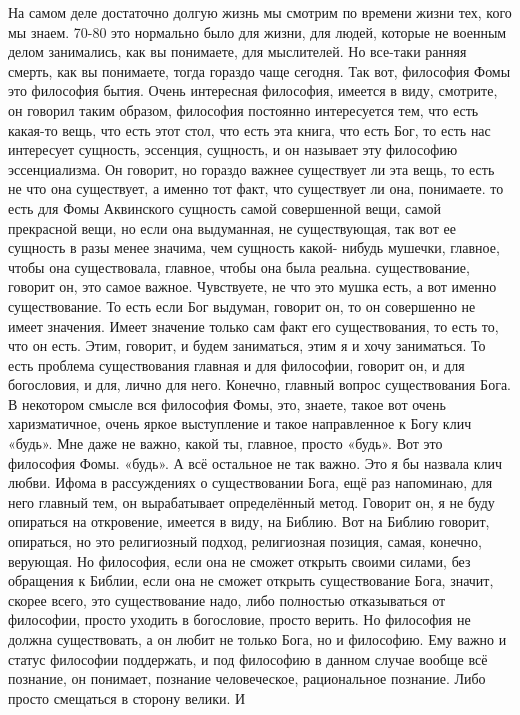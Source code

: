 На самом деле достаточно долгую жизнь мы смотрим по времени жизни тех, кого мы
знаем. 70-80 это нормально было для жизни, для людей, которые не военным делом
занимались, как вы понимаете, для мыслителей. Но все-таки ранняя смерть, как вы
понимаете, тогда гораздо чаще сегодня. Так вот, философия Фомы это философия
бытия. Очень интересная философия, имеется в виду, смотрите, он говорил таким
образом, философия постоянно интересуется тем, что есть какая-то вещь, что есть
этот стол, что есть эта книга, что есть Бог, то есть нас интересует сущность,
эссенция, сущность, и он называет эту философию эссенциализма. Он говорит, но
гораздо важнее существует ли эта вещь, то есть не что она существует, а именно
тот факт, что существует ли она, понимаете. то есть для Фомы Аквинского сущность
самой совершенной вещи, самой прекрасной вещи, но если она выдуманная, не
существующая, так вот ее сущность в разы менее значима, чем сущность какой-
нибудь мушечки, главное, чтобы она существовала, главное, чтобы она была
реальна. существование, говорит он, это самое важное. Чувствуете, не что это
мушка есть, а вот именно существование. То есть если Бог выдуман, говорит он, то
он совершенно не имеет значения. Имеет значение только сам факт его
существования, то есть то, что он есть. Этим, говорит, и будем заниматься, этим
я и хочу заниматься. То есть проблема существования главная и для философии,
говорит он, и для богословия, и для, лично для него. Конечно, главный вопрос
существования Бога. В некотором смысле вся философия Фомы, это, знаете, такое
вот очень харизматичное, очень яркое выступление и такое направленное к Богу
клич «будь». Мне даже не важно, какой ты, главное, просто «будь». Вот это
философия Фомы. «будь». А всё остальное не так важно. Это я бы назвала клич
любви. Ифома в рассуждениях о существовании Бога, ещё раз напоминаю, для него
главный тем, он вырабатывает определённый метод. Говорит он, я не буду опираться
на откровение, имеется в виду, на Библию. Вот на Библию говорит, опираться, но
это религиозный подход, религиозная позиция, самая, конечно, верующая. Но
философия, если она не сможет открыть своими силами, без обращения к Библии,
если она не сможет открыть существование Бога, значит, скорее всего, это
существование надо, либо полностью отказываться от философии, просто уходить в
богословие, просто верить. Но философия не должна существовать, а он любит не
только Бога, но и философию. Ему важно и статус философии поддержать, и под
философию в данном случае вообще всё познание, он понимает, познание
человеческое, рациональное познание. Либо просто смещаться в сторону велики. И
